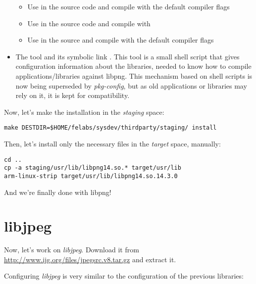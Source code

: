 \begin{itemize}
  \begin{itemize}

  \item Use  in the source code and compile with
    the default compiler flags

  \item Use  in the source code and compile
    with 

  \item Use  in the source and compile
    with the default compiler flags

  \end{itemize}

\item The  tool and its symbolic link
  . This tool is a small shell script
  that gives configuration information about the libraries, needed to
  know how to compile applications/libraries against libpng. This
  mechanism based on shell scripts is now being superseded by {\em
    pkg-config}, but as old applications or libraries may rely on it,
  it is kept for compatibility.

\end{itemize}

Now, let's make the installation in the {\em staging} space:

\begin{verbatim}
make DESTDIR=$HOME/felabs/sysdev/thirdparty/staging/ install
\end{verbatim}

Then, let's install only the necessary files in the {\em target}
space, manually:

\begin{verbatim}
cd ..
cp -a staging/usr/lib/libpng14.so.* target/usr/lib
arm-linux-strip target/usr/lib/libpng14.so.14.3.0
\end{verbatim}

And we're finally done with libpng!

\section{libjpeg}

Now, let's work on {\em libjpeg}. Download it from
\url{http://www.ijg.org/files/jpegsrc.v8.tar.gz} and extract it.

Configuring {\em libjpeg} is very similar to the configuration of the
previous libraries:

